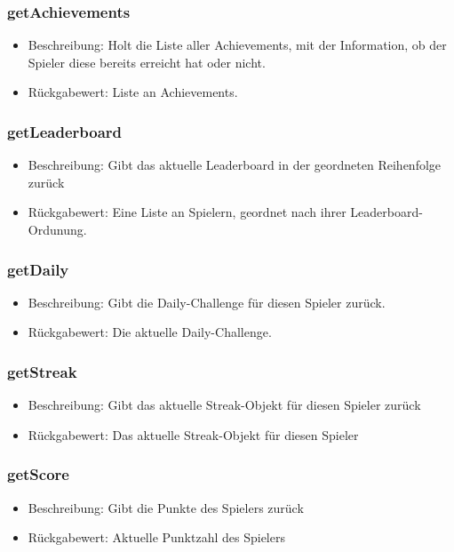 \documentclass[a4paper]{scrreprt}
\begin{document}
    \subsubsection{getAchievements}
    \begin{itemize}
        \item Beschreibung: Holt die Liste aller Achievements, mit der Information, ob der Spieler diese bereits erreicht hat oder nicht.
        \item Rückgabewert: Liste an Achievements.
    \end{itemize}
    \subsubsection{getLeaderboard}
    \begin{itemize}
        \item Beschreibung: Gibt das aktuelle Leaderboard in der geordneten Reihenfolge zurück
        \item Rückgabewert: Eine Liste an Spielern, geordnet nach ihrer Leaderboard-Ordunung.
    \end{itemize}
    \subsubsection{getDaily}
    \begin{itemize}
        \item Beschreibung: Gibt die Daily-Challenge für diesen Spieler zurück.
        \item Rückgabewert: Die aktuelle Daily-Challenge.
    \end{itemize}
    \subsubsection{getStreak}
    \begin{itemize}
        \item Beschreibung: Gibt das aktuelle Streak-Objekt für diesen Spieler zurück
        \item Rückgabewert: Das aktuelle Streak-Objekt für diesen Spieler
    \end{itemize}
    \subsubsection{getScore}
    \begin{itemize}
        \item Beschreibung: Gibt die Punkte des Spielers zurück
        \item Rückgabewert: Aktuelle Punktzahl des Spielers
    \end{itemize}
\end{document}
